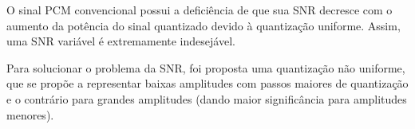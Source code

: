 \begin{subquestion}
    \item O sinal PCM convencional possui a deficiência de que sua SNR decresce com o aumento da potência do sinal quantizado devido à quantização uniforme. Assim, uma SNR variável é extremamente indesejável.
    \item Para solucionar o problema da SNR, foi proposta uma quantização não uniforme, que se propõe a representar baixas amplitudes com passos maiores de quantização e o contrário para grandes amplitudes (dando maior significância para amplitudes menores).
\end{subquestion}